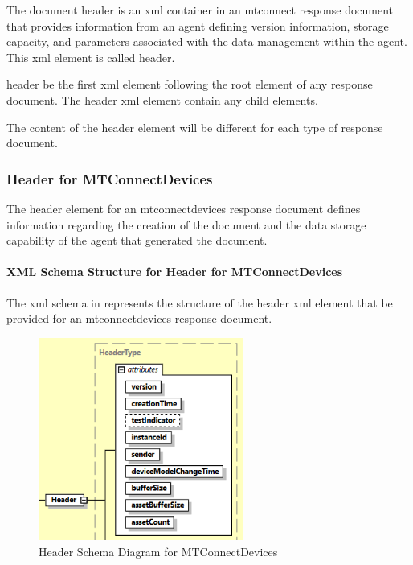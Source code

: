 The \gls{document header} is an \gls{xml} container in an \gls{mtconnect response document} that provides information from an \gls{agent} defining version information, storage capacity, and parameters associated with the data management within the \gls{agent}.  This \gls{xml} element is called \gls{header}.

\gls{header} \MUST be the first \gls{xml} element following the \gls{root element} of any \gls{response document}.  The \gls{header} \gls{xml} element \MUSTNOT contain any \glspl{child element}.  

The content of the \gls{header} element will be different for each type of \gls{response document}.

\subsubsection{Header for MTConnectDevices}

The \gls{header} element for an \gls{mtconnectdevices response document} defines information regarding the creation of the document and the data storage capability of the \gls{agent} that generated the document.  

\paragraph{XML Schema Structure for Header for MTConnectDevices}\mbox{}

The \gls{xml schema} in  represents the structure of the \gls{header} \gls{xml} element that \MUST be provided for an \gls{mtconnectdevices response document}.  

\begin{figure}[ht]
  \centering
  \includegraphics[width=0.6\textwidth]{figures/header-schema-diagram-for-mtconnectdevices.png}
  \caption{Header Schema Diagram for MTConnectDevices}
  \label{fig:header-schema-diagram-for-mtconnectdevices}
\end{figure}

